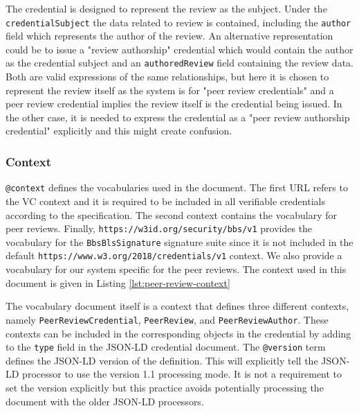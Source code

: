The credential is designed to represent the review as the subject. Under the \lstinline{credentialSubject} the data related to review is contained, including the \lstinline{author} field which represents the author of the review. An alternative representation could be to issue a "review authorship" credential which would contain the author as the credential subject and an \lstinline{authoredReview} field containing the review data. Both are valid expressions of the same relationships, but here it is chosen to represent the review itself as the system is for "peer review credentials" and a peer review credential implies the review itself is the credential being issued. In the other case, it is needed to express the credential as a "peer review authorship credential" explicitly and this might create confusion.

\subsubsection{Context}

\lstinline{@context} defines the vocabularies used in the document. The first \acrshort{URL} refers to the \acrshort{VC} context and it is required to be included in all verifiable credentials according to the specification. The second context contains the vocabulary for peer reviews. Finally, \lstinline{https://w3id.org/security/bbs/v1} provides the vocabulary for the \lstinline{BbsBlsSignature} signature suite since it is not included in the default \lstinline{https://www.w3.org/2018/credentials/v1} context. We also provide a vocabulary for our system specific for the peer reviews. The context used in this document is given in Listing \ref{lst:peer-review-context}



The vocabulary document itself is a context that defines three different contexts, namely \lstinline{PeerReviewCredential}, \lstinline{PeerReview}, and \lstinline{PeerReviewAuthor}. These contexts can be included in the corresponding objects in the credential by adding to the \lstinline{type} field in the \acrshort{JSON-LD} credential document. The \lstinline{@version} term defines the \acrshort{JSON-LD} version of the definition. This will explicitly tell the \acrshort{JSON-LD} processor to use the version 1.1 processing mode. It is not a requirement to set the version explicitly but this practice avoids potentially processing the document with the older \acrshort{JSON-LD} processors. 


